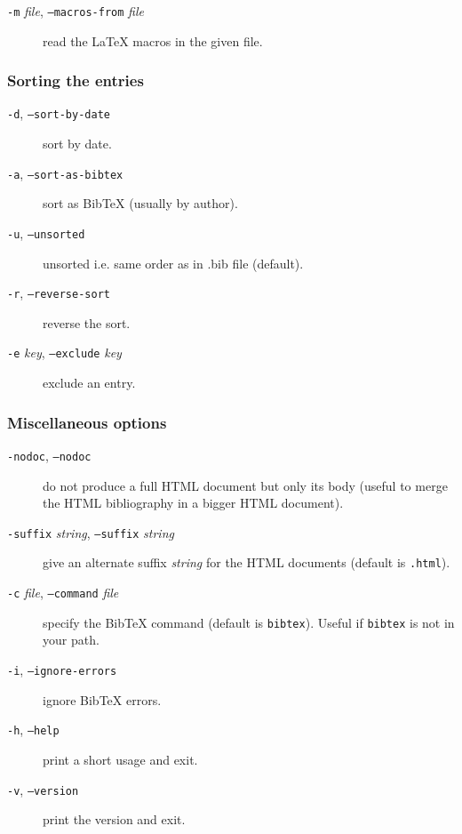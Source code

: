 \documentclass[11pt,a4paper]{article}
\begin{document}
\begin{description}
  
\item[\texttt{-m} \textit{file}, \texttt{--macros-from} \textit{file}]
  read the LaTeX macros in the given file.


\end{description}


\subsubsection{Sorting the entries}

\begin{description}
  
\item[\texttt{-d}, \texttt{--sort-by-date}] sort by date.

  
\item[\texttt{-a}, \texttt{--sort-as-bibtex}] sort as BibTeX (usually
  by author).

  
\item[\texttt{-u}, \texttt{--unsorted}] unsorted i.e. same order as in
  .bib file (default).

  
\item[\texttt{-r}, \texttt{--reverse-sort}] reverse the sort.

  
\item[\texttt{-e} \textit{key}, \texttt{--exclude} \textit{key}]
  exclude an entry.


\end{description}


\subsubsection{Miscellaneous options}

\begin{description}
  
\item[\texttt{-nodoc}, \texttt{--nodoc}] do not produce a full HTML
  document but only its body (useful to merge the HTML bibliography in
  a bigger HTML document).

  
\item[\texttt{-suffix} \textit{string}, \texttt{--suffix}
  \textit{string}] give an alternate suffix \textit{string} for the
  HTML documents (default is \texttt{.html}).

    
\item[\texttt{-c} \textit{file}, \texttt{--command} \textit{file}]
  specify the BibTeX command (default is \texttt{bibtex}).  Useful if
  \texttt{bibtex} is not in your path.

  
\item[\texttt{-i}, \texttt{--ignore-errors}] ignore BibTeX errors.

  
\item[\texttt{-h}, \texttt{--help}] print a short usage and exit.

  
\item[\texttt{-v}, \texttt{--version}] print the version and exit.


\end{description}


\end{document}
